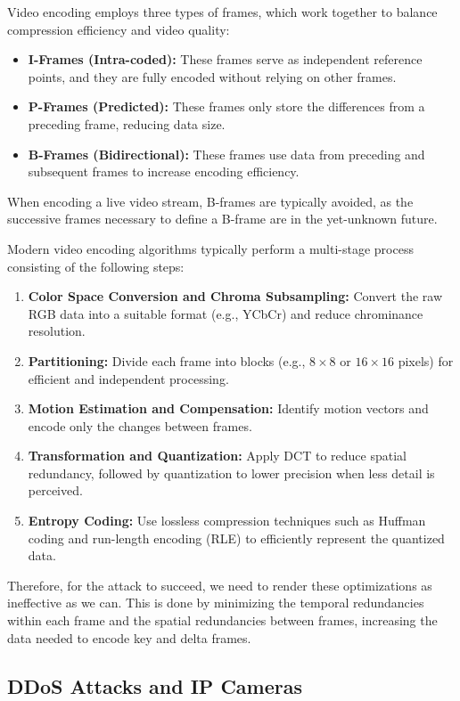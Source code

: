 Video encoding employs three types of frames, which work together to balance compression efficiency and video quality:

\begin{itemize} 
    \item \textbf{I-Frames (Intra-coded):} These frames serve as independent reference points, and they are fully encoded without relying on other frames.
    \item \textbf{P-Frames (Predicted):} These frames only store the differences from a preceding frame, reducing data size.
    \item \textbf{B-Frames (Bidirectional):} These frames use data from preceding and subsequent frames to increase encoding efficiency.
\end{itemize}

When encoding a live video stream, B-frames are typically avoided, as the successive frames necessary to define a B-frame are in the yet-unknown future.

Modern video encoding algorithms typically perform a multi-stage process consisting of the following steps:
\begin{enumerate} 
\item \textbf{Color Space Conversion and Chroma Subsampling:} Convert the raw RGB data into a suitable format (e.g., YCbCr) and reduce chrominance resolution.
\item \textbf{Partitioning:} Divide each frame into blocks (e.g., $8\times8$ or $16\times16$ pixels) for efficient and independent processing.
\item \textbf{Motion Estimation and Compensation:} Identify motion vectors and encode only the changes between frames.
\item \textbf{Transformation and Quantization:} Apply DCT to reduce spatial redundancy, followed by quantization to lower precision when less detail is perceived.
\item \textbf{Entropy Coding:} Use lossless compression techniques such as Huffman coding and run-length encoding (RLE) to efficiently represent the quantized data.
\end{enumerate}

Therefore, for the attack to succeed, we need to render these optimizations as ineffective as we can. This is done by minimizing the temporal redundancies within each frame and the spatial redundancies between frames, increasing the data needed to encode key and delta frames.

\subsection{DDoS Attacks and IP Cameras}

